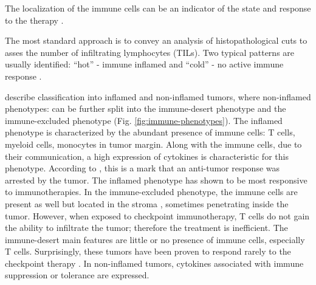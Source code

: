 \documentclass[12pt,]{book}
\theoremstyle{definition}
\theoremstyle{definition}
\theoremstyle{definition}
\theoremstyle{remark}
\begin{document}
The localization of the immune cells can be an indicator of the state
and response to the therapy \citep{Bindea2013}.

The most standard approach is to convey an analysis of histopathological
cuts to asses the number of infiltrating lymphocytes (TILs). Two typical
patterns are usually identified: ``hot'' - immune inflamed and ``cold''
- no active immune response \citep{Berghoff2018}.

\citet{Chen2017} describe classification into inflamed and non-inflamed
tumors, where non-inflamed phenotypes: can be further split into the
immune-desert phenotype and the immune-excluded phenotype (Fig.
\ref{fig:immune-phenotypes}). The inflamed phenotype is characterized by
the abundant presence of immune cells: T cells, myeloid cells, monocytes
in tumor margin. Along with the immune cells, due to their
communication, a high expression of cytokines is characteristic for this
phenotype. According to \citet{Chen2017}, this is a mark that an
anti-tumor response was arrested by the tumor. The inflamed phenotype
has shown to be most responsive to immunotherapies. In the
immune-excluded phenotype, the immune cells are present as well but
located in the stroma \citep{Herbst2014}, sometimes penetrating inside
the tumor. However, when exposed to checkpoint immunotherapy, T cells do
not gain the ability to infiltrate the tumor; therefore the treatment is
inefficient. The immune-desert main features are little or no presence
of immune cells, especially T cells. Surprisingly, these tumors have
been proven to respond rarely to the checkpoint therapy
\citep{Herbst2014}. In non-inflamed tumors, cytokines associated with
immune suppression or tolerance are expressed.
\end{document}
